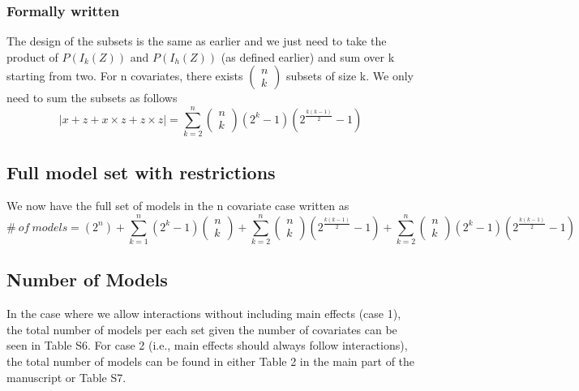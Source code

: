 \subsubsection{Formally written}
The design of the subsets is the same as earlier and we just need to take the product of
$P\left(I_k\left(Z\right)\right)$ and $P\left(I_h\left(Z\right)\right)$ (as defined earlier)  and sum over k starting from two.
For n covariates, there exists $\left( \begin{array}{c}
n \\ 
k \end{array}
\right)$ subsets of size k. We only need to sum the subsets as follows
\[|x + z + x \times z+z \times z|=\sum^n_{k=2}{\left( \begin{array}{c}
n \\ 
k \end{array}
\right)\left(2^k-1\right)\left(2^{\frac{k\left(k-1\right)}{2}}-1\right)}\] 

\subsection{Full model set with restrictions}
We now have the full set of models in the n covariate case written as
\[\#\ of\ models=\left(2^n\right)+\sum^n_{k=1}{\left(2^k-1\right)\left( \begin{array}{c}
n \\ 
k \end{array}
\right)}+\sum^n_{k=2}{\left( \begin{array}{c}
n \\ 
k \end{array}
\right)\left(2^{\frac{k\left(k-1\right)}{2}}-1\right)}+\sum^n_{k=2}{\left( \begin{array}{c}
n \\ 
k \end{array}
\right)\left(2^k-1\right)\left(2^{\frac{k\left(k-1\right)}{2}}-1\right)}\] 
\subsection{Number of Models}

\noindent In the case where we allow interactions without including main effects (case 1), the total number of models per each set given the number of covariates can be seen in Table S6. For case 2 (i.e., main effects should always follow interactions), the total number of models can be found in either Table 2 in the main part of the manuscript or Table S7. 

